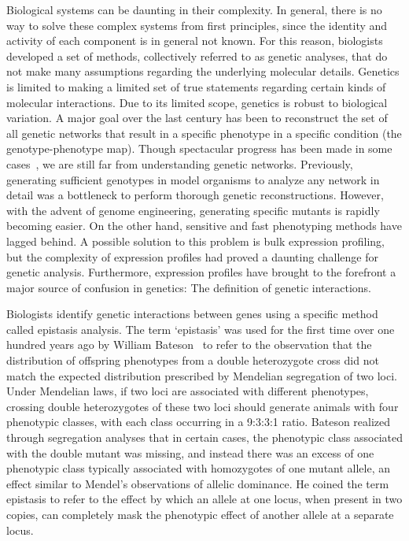 Biological systems can be daunting in their complexity. In general, there is no
way to solve these complex systems from first principles, since the identity and
activity of each component is in general not known. For this reason, biologists
developed a set of methods, collectively referred to as genetic analyses, that
do not make many assumptions regarding the underlying molecular details.
Genetics is limited to making a limited set of true statements regarding certain
kinds of molecular interactions. Due to its limited scope, genetics is robust to
biological variation. A major goal over the last century has been to reconstruct
the set of all genetic networks that result in a specific phenotype in a
specific condition (the genotype-phenotype map). Though spectacular progress has
been made in some cases~\citep{Costanzo2016}, we are still far from
understanding genetic networks. Previously, generating sufficient genotypes in
model organisms to analyze any network in detail was a bottleneck to perform
thorough genetic reconstructions. However, with the advent of genome
engineering, generating specific mutants is rapidly becoming easier. On the
other hand, sensitive and fast phenotyping methods have lagged behind. A
possible solution to this problem is bulk expression profiling, but the
complexity of expression profiles had proved a daunting challenge for genetic
analysis. Furthermore, expression profiles have brought to the forefront a major
source of confusion in genetics: The definition of genetic interactions.

Biologists identify genetic interactions between genes using a specific method
called epistasis analysis. The term `epistasis' was used for the first time over
one hundred years ago by William Bateson~\citep{Bateson2009} to refer to the
observation that the distribution of offspring phenotypes from a double
heterozygote cross did not match the expected distribution prescribed by
Mendelian segregation of two loci. Under Mendelian laws, if two loci are
associated with different phenotypes, crossing double heterozygotes of these two
loci should generate animals with four phenotypic classes, with each class
occurring in a 9:3:3:1 ratio. Bateson realized through segregation analyses that
in certain cases, the phenotypic class associated with the double mutant was
missing, and instead there was an excess of one phenotypic class typically
associated with homozygotes of one mutant allele, an effect similar to Mendel's
observations of allelic dominance. He coined the term epistasis to refer to the
effect by which an allele at one locus, when present in two copies, can
completely mask the phenotypic effect of another allele at a separate locus.

